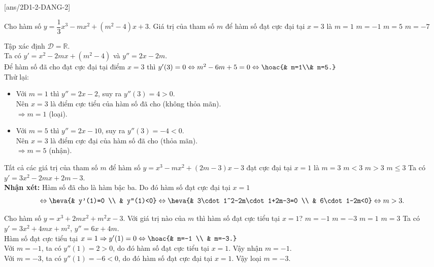\BTTN
{}[ans/2D1-2-DANG-2]
\begin{ex}%
    Cho hàm số $y=\dfrac{1}{3}x^3-m x^2+\left(m^2-4\right)x+3$. Giá trị của tham số $m$ để hàm số đạt cực đại tại $x=3$ là
    \choice
    {$m=1$}
    {$m=-1$}
    {\True $m=5$}
    {$m=-7$}
    \loigiai
    {
        Tập xác định $\mathscr D=\mathbb{R}$.\\
        Ta có $y'=x^2-2mx+(m^2-4)$ và $y''=2x-2m$.\\
        Để hàm số đã cho đạt cực đại tại điểm $x=3$ thì $y'(3)=0
        \Leftrightarrow m^2-6m+5=0 \Leftrightarrow\hoac{& m=1\\& m=5.}$\\
        Thử lại:
        \begin{itemize}
            \item Với $m=1$ thì $y''=2x-2$, suy ra $y''(3)=4>0$.\\
            Nên $x=3$ là điểm cực tiểu của hàm số đã cho (không thỏa mãn).\\
            $\Rightarrow m=1$ (loại).
            \item Với $m=5$ thì $y''=2x-10$, suy ra $y''(3)=-4<0$.\\
            Nên $x=3$ là điểm cực đại của hàm số đã cho (thỏa mãn).\\
            $\Rightarrow m=5$ (nhận).
        \end{itemize}
    }
\end{ex}
\begin{ex}%
    Tất cả các giá trị của tham số $m$ để hàm số $y=x^3-m x^2+(2m-3)x-3$ đạt cực đại tại $x=1$ là
    \choice
    {$m=3$}
    {$m<3$}
    {\True $m>3$}
    {$m\le 3$}
    \loigiai
    {
        Ta có $y'=3x^2-2mx+2m-3$.\\
        \textbf{Nhận xét:} Hàm số đã cho là hàm bậc ba. Do đó hàm số đạt cực đại tại $x=1$
        $$\Leftrightarrow\heva{& y'(1)=0 \\ & y''(1)<0} \Leftrightarrow \heva{& 3\cdot1^2-2m\cdot 1+2m-3=0 \\ & 6\cdot1-2m<0}\Leftrightarrow m>3.$$
    }
\end{ex}
\begin{ex}%
    Cho hàm số $y=x^3+2m x^2+m^2x-3$. Với giá trị nào của $m$ thì hàm số đạt cực tiểu tại $x=1$?
    \choice
    {\True $m=-1$}
    {$m=-3$}
    {$m=1$}
    {$m=3$}
    \loigiai
    {
        Ta có $y'=3x^2+4mx+m^2$, $y''=6x+4m$.\\
        Hàm số đạt cực tiểu tại $x=1\Rightarrow y'(1)=0\Leftrightarrow \hoac{& m=-1 \\ & m=-3.}$\\
        Với $m=-1$, ta có $y''(1)=2>0$, do đó hàm số đạt cực tiểu tại $x=1$. Vậy nhận $m=-1$.\\
        Với $m=-3$, ta có $y''(1)=-6<0$, do đó hàm số đạt cực đại tại $x=1$. Vậy loại $m=-3$.
    }
\end{ex}
